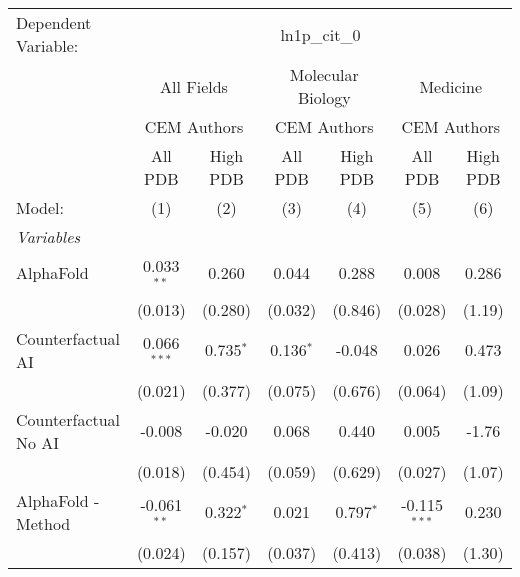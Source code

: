 \begingroup
\centering
\begin{tabular}{lcccccc}
   \tabularnewline \midrule \midrule
   Dependent Variable: & \multicolumn{6}{c}{ln1p\_cit\_0}\\
 & \multicolumn{2}{c}{All Fields} & \multicolumn{2}{c}{Molecular Biology} & \multicolumn{2}{c}{Medicine} \\
\cmidrule(lr){2-3} \cmidrule(lr){4-5} \cmidrule(lr){6-7}
 & \multicolumn{2}{c}{CEM Authors} & \multicolumn{2}{c}{CEM Authors} & \multicolumn{2}{c}{CEM Authors} \\
\cmidrule(lr){2-3} \cmidrule(lr){4-5} \cmidrule(lr){6-7}
 & \multicolumn{1}{c}{All PDB} & \multicolumn{1}{c}{High PDB} & \multicolumn{1}{c}{All PDB} & \multicolumn{1}{c}{High PDB} & \multicolumn{1}{c}{All PDB} & \multicolumn{1}{c}{High PDB} \\
\cmidrule(lr){2-2} \cmidrule(lr){3-3} \cmidrule(lr){4-4} \cmidrule(lr){5-5} \cmidrule(lr){6-6} \cmidrule(lr){7-7}
   Model:                                                     & (1)           & (2)          & (3)           & (4)         & (5)            & (6)\\  
   \midrule
   \emph{Variables}\\
   AlphaFold                                                  & 0.033$^{**}$  & 0.260        & 0.044         & 0.288       & 0.008          & 0.286\\   
                                                              & (0.013)       & (0.280)      & (0.032)       & (0.846)     & (0.028)        & (1.19)\\   
   Counterfactual AI                                          & 0.066$^{***}$ & 0.735$^{*}$  & 0.136$^{*}$   & -0.048      & 0.026          & 0.473\\   
                                                              & (0.021)       & (0.377)      & (0.075)       & (0.676)     & (0.064)        & (1.09)\\   
   Counterfactual No AI                                       & -0.008        & -0.020       & 0.068         & 0.440       & 0.005          & -1.76\\   
                                                              & (0.018)       & (0.454)      & (0.059)       & (0.629)     & (0.027)        & (1.07)\\   
   AlphaFold - Method                                         & -0.061$^{**}$ & 0.322$^{*}$  & 0.021         & 0.797$^{*}$ & -0.115$^{***}$ & 0.230\\   
                                                              & (0.024)       & (0.157)      & (0.037)       & (0.413)     & (0.038)        & (1.30)\\   

\end{tabular}
